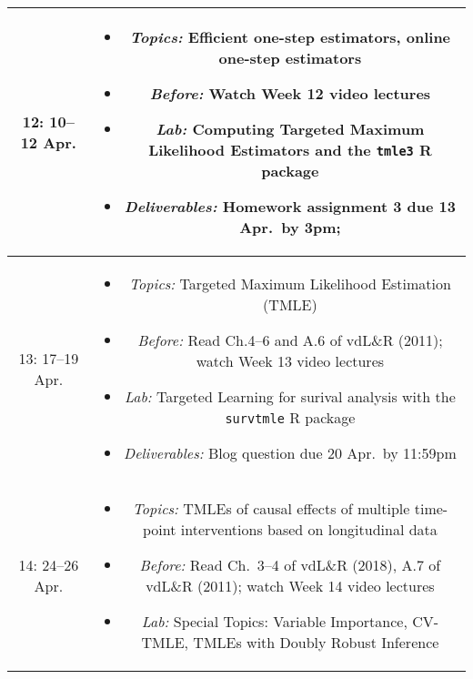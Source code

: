 \documentclass[11pt]{article}
\begin{document}
\begin{table}[H]
\begin{tabular}{ | c | c | }
12: 10--12 Apr. & \begin{minipage}{.85\textwidth}
\begin{itemize} \itemsep-0.4em
  \vspace{1mm}
  \item \textit{Topics:} Efficient one-step estimators, online one-step
    estimators
  \item \textit{Before:} Watch Week 12 video lectures
  \item \textit{Lab:} Computing Targeted Maximum Likelihood Estimators and the
    \texttt{tmle3} R package
  \item \textit{Deliverables:} Homework assignment 3 due 13 Apr.~by 3pm;
  \vspace{1mm}
\end{itemize}
\end{minipage} \\
\hline

13: 17--19 Apr. & \begin{minipage}{.85\textwidth}
\begin{itemize} \itemsep-0.4em
  \vspace{1mm}
  \item \textit{Topics:} Targeted Maximum Likelihood Estimation (TMLE)
  \item \textit{Before:} Read Ch.4--6 and A.6 of vdL\&R (2011); watch Week 13
  video lectures
  \item \textit{Lab:} Targeted Learning for surival analysis with the
    \texttt{survtmle} R package
  \item \textit{Deliverables:} Blog question due 20 Apr.~by 11:59pm
  \vspace{1mm}
\end{itemize}
\end{minipage} \\
\hline

14: 24--26 Apr. & \begin{minipage}{.85\textwidth}
\begin{itemize} \itemsep-0.4em
  \vspace{1mm}
  \item \textit{Topics:} TMLEs of causal effects of multiple time-point
    interventions based on longitudinal data
  \item \textit{Before:} Read Ch.~3--4 of vdL\&R (2018), A.7 of vdL\&R (2011);
  watch Week 14 video lectures
  \item \textit{Lab:} Special Topics: Variable Importance, CV-TMLE, TMLEs with
    Doubly Robust Inference
  \vspace{1mm}
\end{itemize}
\end{minipage} \\
\hline


\end{tabular}
\end{table}
\end{document}
